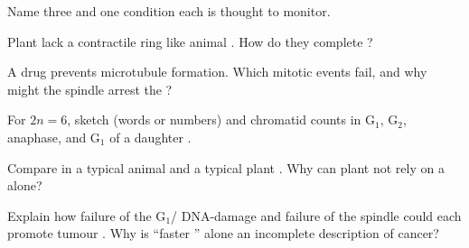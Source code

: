 \begin{exercise}[$\star\star$]\label{exo:g11:cell-cycle-mitosis:7}
Name three  and one condition each is thought to monitor.
\end{exercise}

\begin{exercise}[$\star\star$]\label{exo:g11:cell-cycle-mitosis:8}
Plant  lack a contractile ring like animal . How do they complete
?
\end{exercise}

\begin{exercise}[$\star\star\star$]\label{exo:g11:cell-cycle-mitosis:9}
A drug prevents microtubule formation. Which mitotic events fail, and why might
the spindle  arrest the ?
\end{exercise}

\begin{exercise}[$\star\star\star$]\label{exo:g11:cell-cycle-mitosis:10}
For $2n = 6$, sketch (words or numbers)  and chromatid counts in
G$_1$, G$_2$, anaphase, and G$_1$ of a daughter .
\end{exercise}

\begin{exercise}[$\star\star$]\label{exo:g11:cell-cycle-mitosis:11}
Compare  in a typical animal  and a typical plant . Why
can plant  not rely on a  alone?
\end{exercise}

\begin{exercise}[$\star\star\star$]\label{exo:g11:cell-cycle-mitosis:12}
Explain how failure of the G$_1$/ DNA-damage  and failure of the
spindle  could each promote tumour . Why is ``faster
'' alone an incomplete description of cancer?
\end{exercise}

